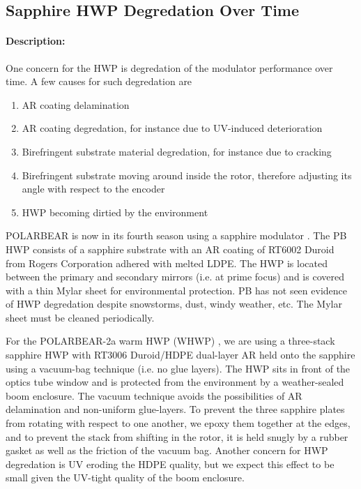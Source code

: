 \subsection{Sapphire HWP Degredation Over Time}

\paragraph{Description:} 

One concern for the HWP is degredation of the modulator performance over time. A few causes for such degredation are

\begin{enumerate}
	\item AR coating delamination
	\item AR coating degredation, for instance due to UV-induced deterioration
	\item Birefringent substrate material degredation, for instance due to cracking
	\item Birefringent substrate moving around inside the rotor, therefore adjusting its angle with respect to the encoder
	\item HWP becoming dirtied by the environment
\end{enumerate}

POLARBEAR is now in its fourth season using a sapphire modulator \cite{PB1_WHWP}. The PB HWP consists of a sapphire substrate with an AR coating of RT6002 Duroid from Rogers Corporation adhered with melted LDPE. The HWP is located between the primary and secondary mirrors (i.e. at prime focus) and is covered with a thin Mylar sheet for environmental protection. PB has not seen evidence of HWP degredation despite snowstorms, dust, windy weather, etc. The Mylar sheet must be cleaned periodically.

For the POLARBEAR-2a warm HWP (WHWP) \cite{PB2a_WHWP}, we are using a three-stack sapphire HWP with RT3006 Duroid/HDPE dual-layer AR held onto the sapphire using a vacuum-bag technique (i.e. no glue layers). The HWP sits in front of the optics tube window and is protected from the environment by a weather-sealed boom enclosure. The vacuum technique avoids the possibilities of AR delamination and non-uniform glue-layers. To prevent the three sapphire plates from rotating with respect to one another, we epoxy them together at the edges, and to prevent the stack from shifting in the rotor, it is held snugly by a rubber gasket as well as the friction of the vacuum bag. Another concern for HWP degredation is UV eroding the HDPE quality, but we expect this effect to be small given the UV-tight quality of the boom enclosure.

